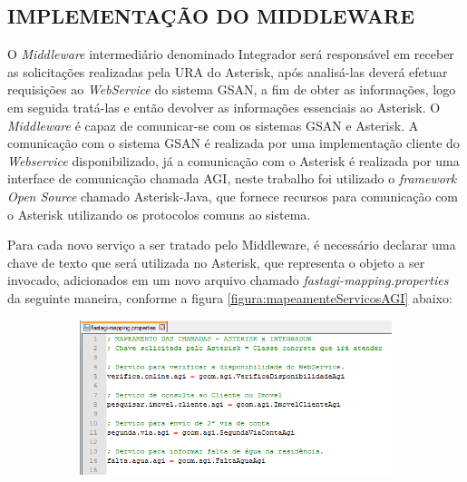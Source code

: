 \subsection{\textbf{\uppercase{Implementação do Middleware}}}

O \textit{Middleware} intermediário denominado Integrador será responsável em receber as solicitações realizadas pela URA do Asterisk, após analisá-las deverá efetuar requisições ao \textit{WebService} do sistema GSAN, a fim de obter as informações, logo em seguida tratá-las e então devolver as informações essenciais ao Asterisk.
O \textit{Middleware} é capaz de comunicar-se com os sistemas GSAN e Asterisk. A comunicação com o sistema GSAN é realizada por uma implementação cliente do \textit{Webservice} disponibilizado, já a comunicação com o Asterisk é realizada por uma interface de comunicação chamada AGI, neste trabalho foi utilizado o \textit{framework} \textit{Open Source} chamado Asterisk-Java, que fornece recursos para comunicação com o Asterisk utilizando os protocolos comuns ao sistema.

Para cada novo serviço a ser tratado pelo Middleware, é necessário declarar uma chave de texto que será utilizada no Asterisk, que representa o objeto a ser invocado, adicionados em um novo arquivo chamado \textit{fastagi-mapping.properties} da seguinte maneira, conforme a figura \ref{figura:mapeamenteServicosAGI} abaixo:

\begin{figure}[H]
	\centering
	\caption{Mapeamento dos serviços para consumo via AGI}
	\label{figura:mapeamenteServicosAGI}
	\begin{subfigure}[H]{\textwidth}
		\centering
		\includegraphics{figuras/mapeamento_servicos_agi.png}
	\end{subfigure}
\end{figure}



